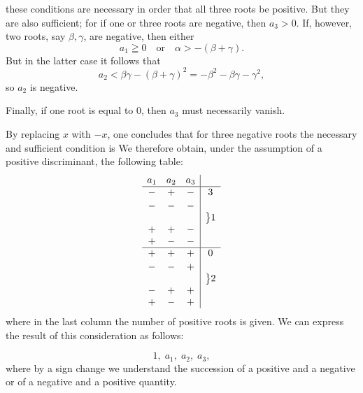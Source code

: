 
these conditions are necessary in order that all three roots be
positive. But they are also sufficient; for if one or three roots
are negative, then $a_3 > 0$. If, however, two roots, say
$\beta, \gamma$, are negative, then either
\[
a_1 \geqq 0 \quad \text{or} \quad \alpha > -(\beta + \gamma).
\]
But in the latter case it follows that
\[
a_2 < \beta\gamma - (\beta + \gamma)^2 = -\beta^2 - \beta\gamma - \gamma^2,
\]
so $a_2$ is negative.

Finally, if one root is equal to 0, then $a_3$ must necessarily
vanish.

By replacing $x$ with $-x$, one concludes that for three
negative roots the necessary and sufficient condition is
We therefore obtain, under the assumption of a positive
discriminant, the following table:
\[
\begin{array}{ccc|c}
a_1 & a_2 & a_3 & \\ \hline
- & + & - & 3\\[2pt]
- & - & - & \\
+ & + & - & \raisebox{1.2em}{$\big\}1$}\\
+ & - & - & \\ \hline
+ & + & + & 0\\[2pt]
- & - & + & \\
- & + & + & \raisebox{1.2em}{$\big\}2$}\\
+ & - & + &
\end{array}
\]
where in the last column the number of positive roots is given.
We can express the result of this consideration as follows:

\[
1, \; a_1, \; a_2, \; a_3,
\]
where by a sign change we understand the succession of a
positive and a negative or of a negative and a positive
quantity.
